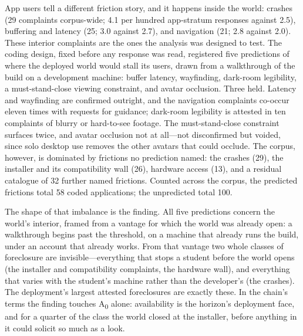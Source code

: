 App users tell a different friction story, and it happens inside the world:
crashes (29 complaints corpus-wide; 4.1 per hundred app-stratum responses
against 2.5), buffering and latency (25; 3.0 against 2.7), and navigation
(21; 2.8 against 2.0). These interior complaints are the ones the analysis
was designed to test. The coding design, fixed before any response was read,
registered five predictions of where the deployed world would stall its
users, drawn from a walkthrough of the build on a development machine:
buffer latency, wayfinding, dark-room legibility, a must-stand-close viewing
constraint, and avatar occlusion. Three held. Latency and wayfinding are
confirmed outright, and the navigation complaints co-occur eleven times with
requests for guidance; dark-room legibility is attested in ten complaints of
blurry or hard-to-see footage. The must-stand-close constraint surfaces
twice, and avatar occlusion not at all---not disconfirmed but voided, since
solo desktop use removes the other avatars that could occlude. The corpus,
however, is dominated by frictions no prediction named: the crashes (29),
the installer and its compatibility wall (26), hardware access (13), and a
residual catalogue of 32 further named frictions. Counted across the corpus,
the predicted frictions total 58 coded applications; the unpredicted
total 100.

The shape of that imbalance is the finding. All five predictions concern the
world's interior, framed from a vantage for which the world was already
open: a walkthrough begins past the threshold, on a machine that already
runs the build, under an account that already works. From that vantage two
whole classes of foreclosure are invisible---everything that stops a student
before the world opens (the installer and compatibility complaints, the
hardware wall), and everything that varies with the student's machine rather
than the developer's (the crashes). The deployment's largest attested
foreclosures are exactly these. In the chain's terms the finding touches
A\textsubscript{0} alone: availability is the horizon's deployment face, and
for a quarter of the class the world closed at the installer, before
anything in it could solicit so much as a look.

